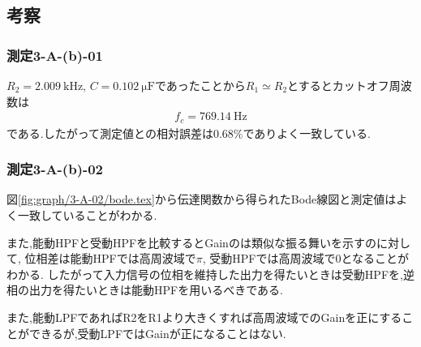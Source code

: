 \subsection{考察}
\subsubsection{測定3-A-(b)-01}
$R_2=2.009\ \si{\kilo\hertz}$, $C=0.102\ \si{\micro\farad}$であったことから$R_1\simeq R_2$とするとカットオフ周波数は
\begin{align}
  f_c=769.14\ \si{\hertz}
\end{align}
である.したがって測定値との相対誤差は$0.68\%$でありよく一致している.
\subsubsection{測定3-A-(b)-02}
図\ref{fig:graph/3-A-02/bode.tex}から伝達関数から得られたBode線図と測定値はよく一致していることがわかる.

また,能動HPFと受動HPFを比較するとGainのは類似な振る舞いを示すのに対して,
位相差は能動HPFでは高周波域で$\pi$, 受動HPFでは高周波域で0となることがわかる.
したがって入力信号の位相を維持した出力を得たいときは受動HPFを,逆相の出力を得たいときは能動HPFを用いるべきである.

また,能動LPFであればR2をR1より大きくすれば高周波域でのGainを正にすることができるが,受動LPFではGainが正になることはない.